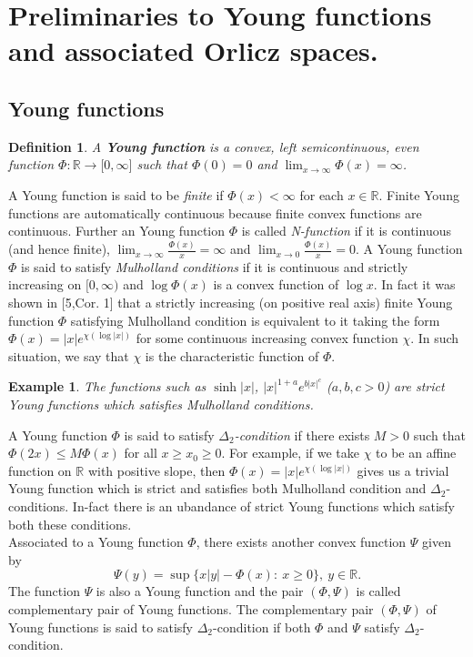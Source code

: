 \documentclass[pdflatex,sn-mathphys-num]{sn-jnl}%
\newtheorem{definition}{Definition}
\theoremstyle{thmstyleone}%
\theoremstyle{thmstyletwo}%
\newtheorem{example}{Example}%
\theoremstyle{thmstylethree}%
\begin{document}
\section{Preliminaries to Young functions and associated Orlicz spaces.}
\subsection{Young functions}
\begin{definition} A {\bf Young function} is a convex, left semicontinuous, even  function $\Phi:\mathbb R\to \mathbb [0,\infty]$  such that  $\Phi(0)=0$ and  $\lim_{x\to \infty}\Phi(x)=\infty$.
\end{definition}
A Young function is said to be {\it finite} if $\Phi(x)<\infty$ for each $x\in \mathbb R$. Finite Young functions are automatically continuous because finite convex functions are continuous. Further an Young function $\Phi$ is called {\it N-function} if it is continuous (and hence finite), $\lim_{x\to \infty}\frac{\Phi(x)}{x}=\infty$ and $\lim_{x\to0}\frac{\Phi(x)}{x}=0$. A Young function $\Phi$ is said to satisfy \textit{Mulholland conditions} if it is continuous and strictly increasing on $[0,\infty)$ and $\log \Phi(x)$ is a convex function of $\log x$. In fact it was shown in \cite{Mulholland}[5,Cor. 1] that a strictly increasing (on positive real axis) finite Young function $\Phi$ satisfying Mulholland condition is equivalent to it taking the form $\Phi(x)=|x|e^{\chi(\log |x|)}$ for some continuous increasing convex function $\chi$. In such situation, we say that $\chi$ is the characteristic function of $\Phi$.\\

\begin{example} The functions such as $\sinh |x|$, $|x|^{1+a}e^{b|x|^c}$ ($a,b,c>0$) are strict Young functions which satisfies Mulholland conditions.\end{example}

A Young function $\Phi$ is said to satisfy \textit{$\Delta_2$-condition} if there exists $M>0$ such that $\Phi(2x)\leq M\Phi(x)$ for all $x\geq x_0\geq 0$. For example, if we take $\chi$ to be an affine function on $\mathbb R$ with positive slope, then 
$\Phi(x)=|x|e^{\chi(\log |x|)}$ gives us a trivial Young function which is strict and satisfies both Mulholland condition and $\Delta_2$-conditions. In-fact there is an ubandance of strict Young functions which satisfy both these conditions. \\

Associated to a Young function $\Phi$, there exists another convex function $\Psi$ given by $$\Psi(y)=\sup\{x|y|-\Phi(x):~x\geq 0\},~y\in \mathbb R.$$ The function $\Psi$ is also a Young function and the pair $(\Phi,\Psi)$ is called complementary pair of Young functions. The complementary pair $(\Phi,\Psi)$ of Young functions is said to satisfy $\Delta_2$-condition if both $\Phi$ and $\Psi$ satisfy $\Delta_2$-condition.\\
\end{document}
